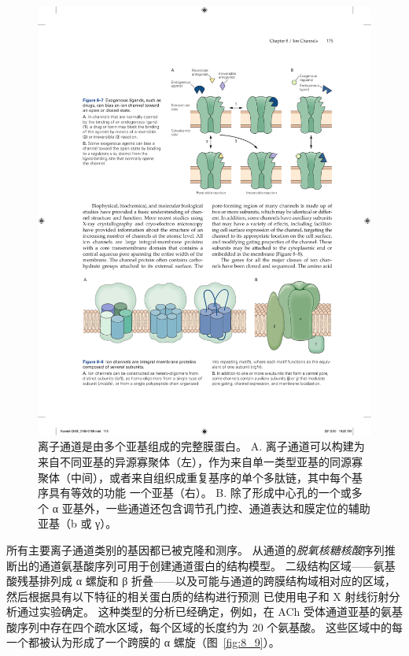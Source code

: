 \begin{figure}[htbp]
	\centering
	\includegraphics[width=1.0\linewidth]{chap08/fig_8_8}
	\caption{离子通道是由多个亚基组成的完整膜蛋白。 A. 离子通道可以构建为来自不同亚基的异源寡聚体（左），作为来自单一类型亚基的同源寡聚体（中间），或者来自组织成重复基序的单个多肽链，其中每个基序具有等效的功能 一个亚基（右）。 B. 除了形成中心孔的一个或多个 α 亚基外，一些通道还包含调节孔门控、通道表达和膜定位的辅助亚基（b 或 γ）。}
	\label{fig:8_8}
\end{figure}


所有主要离子通道类别的基因都已被克隆和测序。
从通道的\textit{脱氧核糖核酸}序列推断出的通道氨基酸序列可用于创建通道蛋白的结构模型。 
二级结构区域——氨基酸残基排列成 α 螺旋和 β 折叠——以及可能与通道的跨膜结构域相对应的区域，然后根据具有以下特征的相关蛋白质的结构进行预测 已使用电子和 X 射线衍射分析通过实验确定。
这种类型的分析已经确定，例如，在 ACh 受体通道亚基的氨基酸序列中存在四个疏水区域，每个区域的长度约为 20 个氨基酸。
这些区域中的每一个都被认为形成了一个跨膜的 α 螺旋（图~\ref{fig:8_9}）。


